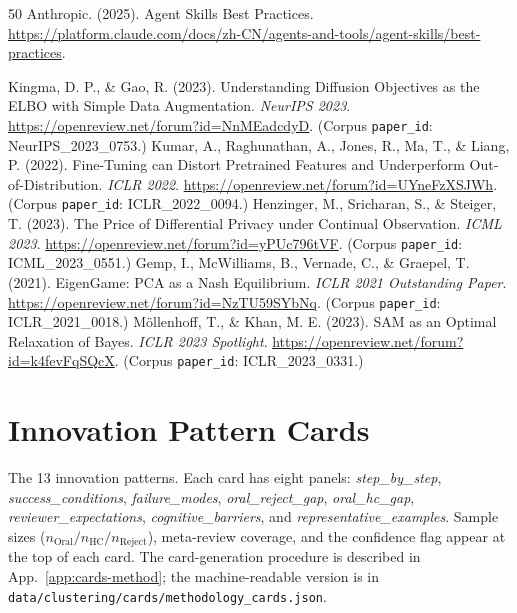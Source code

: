 \documentclass[10pt,a4paper]{article}
\begin{document}
\begin{thebibliography}{50}
 Anthropic. (2025). Agent Skills Best Practices. \url{https://platform.claude.com/docs/zh-CN/agents-and-tools/agent-skills/best-practices}.

 Kingma, D. P., \& Gao, R. (2023). Understanding Diffusion Objectives as the ELBO with Simple Data Augmentation. \emph{NeurIPS 2023}. \url{https://openreview.net/forum?id=NnMEadcdyD}. (Corpus \texttt{paper\_id}: NeurIPS\_2023\_0753.)
 Kumar, A., Raghunathan, A., Jones, R., Ma, T., \& Liang, P. (2022). Fine-Tuning can Distort Pretrained Features and Underperform Out-of-Distribution. \emph{ICLR 2022}. \url{https://openreview.net/forum?id=UYneFzXSJWh}. (Corpus \texttt{paper\_id}: ICLR\_2022\_0094.)
 Henzinger, M., Sricharan, S., \& Steiger, T. (2023). The Price of Differential Privacy under Continual Observation. \emph{ICML 2023}. \url{https://openreview.net/forum?id=yPUc796tVF}. (Corpus \texttt{paper\_id}: ICML\_2023\_0551.)
 Gemp, I., McWilliams, B., Vernade, C., \& Graepel, T. (2021). EigenGame: PCA as a Nash Equilibrium. \emph{ICLR 2021 Outstanding Paper}. \url{https://openreview.net/forum?id=NzTU59SYbNq}. (Corpus \texttt{paper\_id}: ICLR\_2021\_0018.)
 M\"ollenhoff, T., \& Khan, M. E. (2023). SAM as an Optimal Relaxation of Bayes. \emph{ICLR 2023 Spotlight}. \url{https://openreview.net/forum?id=k4fevFqSQcX}. (Corpus \texttt{paper\_id}: ICLR\_2023\_0331.)

\end{thebibliography}


\appendix
\section{Innovation Pattern Cards}
\label{app:cards}

The 13 innovation patterns. Each card has eight panels: \emph{step\_by\_step}, \emph{success\_conditions}, \emph{failure\_modes}, \emph{oral\_reject\_gap}, \emph{oral\_hc\_gap}, \emph{reviewer\_expectations}, \emph{cognitive\_barriers}, and \emph{representative\_examples}. Sample sizes ($n_{\text{Oral}}/n_{\text{HC}}/n_{\text{Reject}}$), meta-review coverage, and the confidence flag appear at the top of each card. The card-generation procedure is described in App.~\ref{app:cards-method}; the machine-readable version is in \texttt{data/clustering/cards/methodology\_cards.json}.
\end{document}

